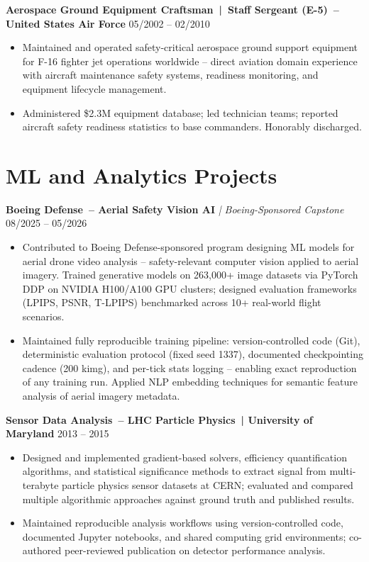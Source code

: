\documentclass[10pt,letterpaper]{moderncv}
\begin{document}
\textbf{Aerospace Ground Equipment Craftsman~|~Staff Sergeant (E-5)~-- United States Air Force} \hfill 05/2002 -- 02/2010
\vspace*{-2mm}
\begin{itemize}[label={-}, itemsep=-1.0ex]
  \item Maintained and operated safety-critical aerospace ground support equipment for F-16 fighter jet operations worldwide -- direct aviation domain experience with aircraft maintenance safety systems, readiness monitoring, and equipment lifecycle management.
  \item Administered \$2.3M equipment database; led technician teams; reported aircraft safety readiness statistics to base commanders. Honorably discharged.
\end{itemize}

\vspace*{2mm}
\section{ML and Analytics Projects}
\vspace*{1mm}

\textbf{Boeing Defense~-- Aerial Safety Vision AI} \textit{| Boeing-Sponsored Capstone} \hfill 08/2025 -- 05/2026
\vspace*{-2mm}
\begin{itemize}[label={-}, itemsep=-1.0ex]
  \item Contributed to Boeing Defense-sponsored program designing ML models for aerial drone video analysis -- safety-relevant computer vision applied to aerial imagery. Trained generative models on 263,000+ image datasets via PyTorch DDP on NVIDIA H100/A100 GPU clusters; designed evaluation frameworks (LPIPS, PSNR, T-LPIPS) benchmarked across 10+ real-world flight scenarios.
  \item Maintained fully reproducible training pipeline: version-controlled code (Git), deterministic evaluation protocol (fixed seed 1337), documented checkpointing cadence (200 kimg), and per-tick stats logging -- enabling exact reproduction of any training run. Applied NLP embedding techniques for semantic feature analysis of aerial imagery metadata.
\end{itemize}

\textbf{Sensor Data Analysis~-- LHC Particle Physics~| University of Maryland} \hfill 2013 -- 2015
\vspace*{-2mm}
\begin{itemize}[label={-}, itemsep=-1.0ex]
  \item Designed and implemented gradient-based solvers, efficiency quantification algorithms, and statistical significance methods to extract signal from multi-terabyte particle physics sensor datasets at CERN; evaluated and compared multiple algorithmic approaches against ground truth and published results.
  \item Maintained reproducible analysis workflows using version-controlled code, documented Jupyter notebooks, and shared computing grid environments; co-authored peer-reviewed publication on detector performance analysis.
\end{itemize}
\end{document}
